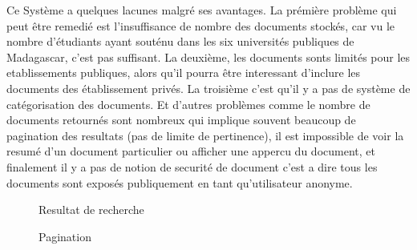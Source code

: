 Ce Système a quelques lacunes malgré ses avantages. La prémière problème qui peut être remedié est l'insuffisance de nombre des documents stockés, car vu le nombre d'étudiants ayant souténu dans les six universités publiques de Madagascar, c'est pas suffisant. La deuxième, les documents sonts limités pour les etablissements publiques, alors qu'il pourra être interessant d'inclure les documents des établissement privés. La troisième c'est qu'il y a pas de système de catégorisation des documents. Et d'autres problèmes comme le nombre de documents retournés sont nombreux qui implique souvent beaucoup de pagination des resultats (pas de limite de pertinence), il est impossible de voir la resumé d'un document particulier ou afficher une appercu du document, et finalement il y a pas de notion de securité de document c'est a dire tous les documents sont exposés publiquement en tant qu'utilisateur anonyme.

\begin{figure}[htbp]
	\begin{center}
		\caption{Resultat de recherche \citep{these-malgache-en-ligne}}
	\end{center}
	\label{resultat-tme}
\end{figure}

\begin{figure}[htbp]
	\begin{center}
		\caption{Pagination \citep{these-malgache-en-ligne}}
	\end{center}
	\label{pagination-tme}
\end{figure}

